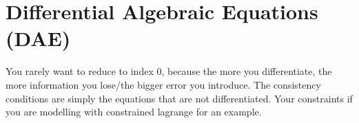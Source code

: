 \section{Differential Algebraic Equations (DAE)}
\begin{figure}[H]
    \centering
    
\end{figure}
\newpage
\begin{figure}
    \centering
    
\end{figure}
You rarely want to reduce to index 0, because the more you differentiate, the more information you lose/the bigger error you introduce.
The consistency conditions are simply the equations that are not differentiated. Your constraints if you are modelling with constrained lagrange for an example. 